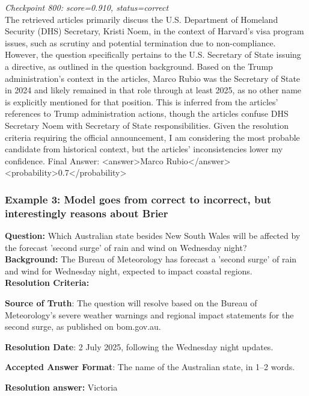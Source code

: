 \documentclass{article} %
\begin{document}
\medskip

\noindent\textit{Checkpoint 800: score=0.910, status=correct}\\
The retrieved articles primarily discuss the U.S. Department of Homeland Security (DHS) Secretary, Kristi Noem, in the context of Harvard's visa program issues, such as scrutiny and potential termination due to non-compliance. However, the question specifically pertains to the U.S. Secretary of State issuing a directive, as outlined in the question background. Based on the Trump administration's context in the articles, Marco Rubio was the Secretary of State in 2024 and likely remained in that role through at least 2025, as no other name is explicitly mentioned for that position. This is inferred from the articles' references to Trump administration actions, though the articles confuse DHS Secretary Noem with Secretary of State responsibilities. Given the resolution criteria requiring the official announcement, I am considering the most probable candidate from historical context, but the articles' inconsistencies lower my confidence. Final Answer: <answer>Marco Rubio</answer> <probability>0.7</probability>

\subsubsection{Example 3: Model goes from correct to incorrect, but interestingly reasons about Brier}

\noindent\textbf{Question:} Which Australian state besides New South Wales will be affected by the forecast 'second surge' of rain and wind on Wednesday night?\\
\noindent\textbf{Background:} The Bureau of Meteorology has forecast a 'second surge' of rain and wind for Wednesday night, expected to impact coastal regions.\\
\noindent\textbf{Resolution Criteria:}

\textbf{Source of Truth}: The question will resolve based on the Bureau of Meteorology's severe weather warnings and regional impact statements for the second surge, as published on bom.gov.au.

\textbf{Resolution Date}: 2 July 2025, following the Wednesday night updates.


\textbf{Accepted Answer Format}: The name of the Australian state, in 1–2 words.

\noindent\textbf{Resolution answer:} Victoria

\medskip
\end{document}
